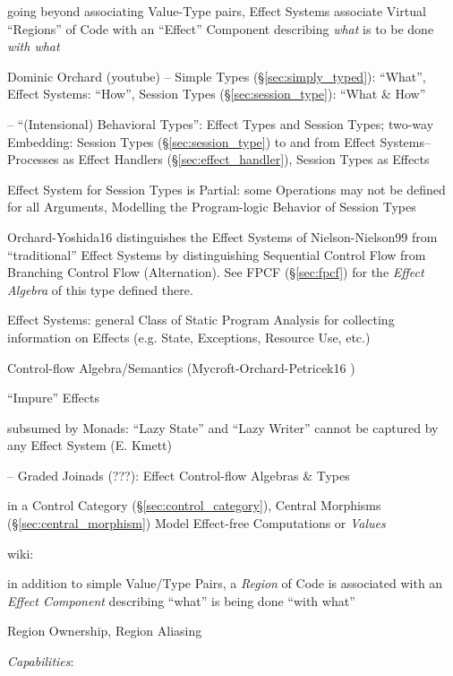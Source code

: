 going beyond associating Value-Type pairs, Effect Systems associate
Virtual ``Regions'' of Code with an ``Effect'' Component describing
\emph{what} is to be done \emph{with what}

Dominic Orchard (youtube) -- Simple Types (\S\ref{sec:simply_typed}):
``What'', Effect Systems: ``How'', Session Types
(\S\ref{sec:session_type}): ``What \& How''

\cite{orchard-yoshida16} -- ``(Intensional) Behavioral Types'': Effect
Types and Session Types; two-way Embedding: Session Types
(\S\ref{sec:session_type}) to and from Effect Systems--Processes as
Effect Handlers (\S\ref{sec:effect_handler}), Session Types as Effects

Effect System for Session Types is Partial: some Operations may not be
defined for all Arguments, Modelling the Program-logic Behavior of
Session Types \cite{orchard-yoshida16} %

\fist Orchard-Yoshida16 \cite{orchard-yoshida16} distinguishes the
Effect Systems of Nielson-Nielson99 \cite{nielson-nielson99} from
``traditional'' Effect Systems by distinguishing Sequential Control
Flow from Branching Control Flow (Alternation). See FPCF
(\S\ref{sec:fpcf}) for the \emph{Effect Algebra} of this type defined
there.

Effect Systems: general Class of Static Program Analysis for
collecting information on Effects (e.g. State, Exceptions, Resource
Use, etc.) \cite{orchard-yoshida16}

Control-flow Algebra/Semantics (Mycroft-Orchard-Petricek16
\cite{mycroft-orchard-petricek16})

``Impure'' Effects

subsumed by Monads: ``Lazy State'' and ``Lazy Writer'' cannot be
captured by any Effect System (E. Kmett)

\cite{mycroft-orchard-petricek16} -- Graded Joinads (???): Effect
Control-flow Algebras \& Types

in a Control Category (\S\ref{sec:control_category}), Central
Morphisms (\S\ref{sec:central_morphism}) Model Effect-free
Computations or \emph{Values} %

wiki:

in addition to simple Value/Type Pairs, a \emph{Region} of Code is
associated with an \emph{Effect Component} describing ``what'' is
being done ``with what''

Region Ownership, Region Aliasing


\emph{Capabilities}: %

